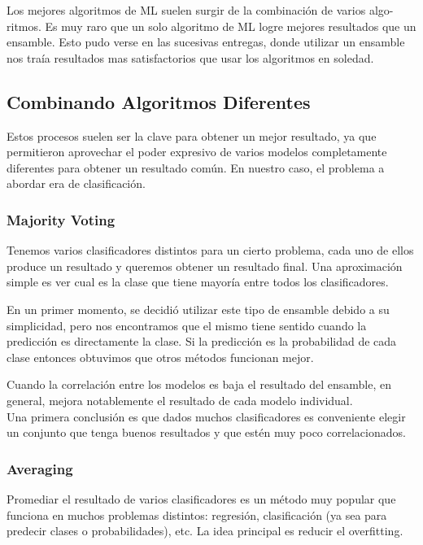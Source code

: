 \documentclass[a4paper ,12pt]{article}
\begin{document}
Los mejores algoritmos de ML suelen surgir de la combinación de varios algo-
ritmos. Es muy raro que un solo algoritmo de ML logre mejores resultados que
un ensamble. Esto pudo verse en las sucesivas entregas, donde utilizar un ensamble nos traía
resultados mas satisfactorios que usar los algoritmos en soledad.

\subsection{Combinando Algoritmos Diferentes}

Estos procesos suelen ser la clave para obtener un mejor resultado, ya que permitieron aprovechar el poder expresivo
de varios modelos completamente diferentes para obtener un resultado común.
En nuestro caso, el problema a abordar era de clasificación.

\subsubsection{Majority Voting}

Tenemos varios clasificadores distintos para un cierto problema, cada uno de ellos produce un resultado y queremos obtener un 
 resultado final. Una aproximación simple es ver cual es la clase que tiene mayoría entre todos los clasificadores.

En un primer momento, se decidió utilizar este tipo de ensamble debido a su simplicidad, 
pero nos encontramos que el mismo tiene sentido cuando la predicción es directamente la clase.
Si la predicción es la probabilidad de cada clase entonces obtuvimos que otros métodos funcionan mejor. 

Cuando la correlación entre los modelos es baja el resultado del ensamble, en general, mejora notablemente el resultado de cada modelo individual. 
\\

Una primera conclusión es que dados muchos clasificadores es conveniente elegir un conjunto que tenga buenos resultados y que estén muy poco correlacionados.

\subsubsection{Averaging}

Promediar el resultado de varios clasificadores es un método muy popular que
funciona en muchos problemas distintos: regresión, clasificación (ya sea para
predecir clases o probabilidades), etc. La idea principal es reducir el overfitting.
\end{document}
